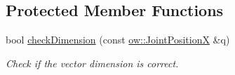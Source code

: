 \subsection*{Protected Member Functions}
\begin{DoxyCompactItemize}
\item 
bool \hyperlink{classow__ik_1_1RobotLimb_a0287b3612567aba4cc322cfbe3a8b870}{check\+Dimension} (const \hyperlink{classow__core_1_1JointPosition}{ow\+::\+Joint\+PositionX} \&q)\hypertarget{classow__ik_1_1RobotLimb_a0287b3612567aba4cc322cfbe3a8b870}{}\label{classow__ik_1_1RobotLimb_a0287b3612567aba4cc322cfbe3a8b870}

\begin{DoxyCompactList}\small\item\em Check if the vector dimension is correct. \end{DoxyCompactList}\end{DoxyCompactItemize}
